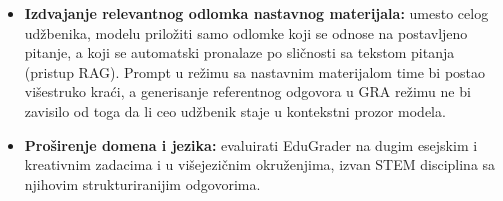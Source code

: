 \begin{itemize}
    Sistem za evaluaciju to tehnički dopušta, jer su faze generisanja i ocenjivanja odvojene:
    potreban je samo zaseban parametar modela za fazu generisanja.
    \item \textbf{Izdvajanje relevantnog odlomka nastavnog materijala:}
    umesto celog udžbenika, modelu priložiti samo odlomke koji se odnose na postavljeno pitanje,
    a koji se automatski pronalaze po sličnosti sa tekstom pitanja (pristup RAG).
    Prompt u režimu sa nastavnim materijalom time bi postao višestruko kraći,
    a generisanje referentnog odgovora u GRA režimu ne bi zavisilo od toga
    da li ceo udžbenik staje u kontekstni prozor modela.
    \item \textbf{Proširenje domena i jezika:} evaluirati EduGrader na dugim esejskim i kreativnim zadacima i u višejezičnim okruženjima,
    izvan STEM disciplina sa njihovim strukturiranijim odgovorima.
\end{itemize}
